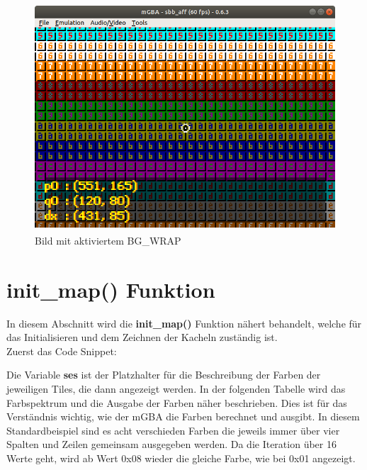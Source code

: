 \begin{figure}[h!]
	\centering
	\includegraphics[height=85mm]{img/bgwrap.png}
	\caption{Bild mit aktiviertem BG\_WRAP}
\end{figure}
\newpage
\section{init\_map() Funktion}
In diesem Abschnitt wird die \textbf{init\_map()} Funktion nähert behandelt, welche für das Initialisieren und dem Zeichnen der Kacheln zuständig ist. \\
Zuerst das Code Snippet:



Die Variable \textbf{ses} ist der Platzhalter für die Beschreibung der Farben der jeweiligen Tiles, die dann angezeigt werden. In der folgenden Tabelle wird das Farbspektrum und die Ausgabe der Farben näher beschrieben. Dies ist für das Verständnis wichtig, wie der mGBA die Farben berechnet und ausgibt. In diesem Standardbeispiel sind es acht verschieden Farben die jeweils immer über vier Spalten und Zeilen gemeinsam ausgegeben werden. Da die Iteration über 16 Werte geht, wird ab Wert 0x08 wieder die gleiche Farbe, wie bei 0x01 angezeigt.


